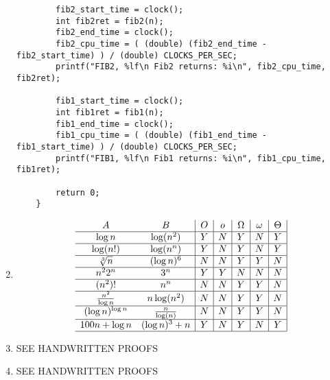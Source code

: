 \documentclass[11pt]{article}
\begin{document}
\begin{enumerate}
\begin{verbatim}
        fib2_start_time = clock();
        int fib2ret = fib2(n);
        fib2_end_time = clock();
        fib2_cpu_time = ( (double) (fib2_end_time - fib2_start_time) ) / (double) CLOCKS_PER_SEC;
        printf("FIB2, %lf\n Fib2 returns: %i\n", fib2_cpu_time, fib2ret);
    
        fib1_start_time = clock();
        int fib1ret = fib1(n);
        fib1_end_time = clock();
        fib1_cpu_time = ( (double) (fib1_end_time - fib1_start_time) ) / (double) CLOCKS_PER_SEC;
        printf("FIB1, %lf\n Fib1 returns: %i\n", fib1_cpu_time, fib1ret);
    
        return 0;
    }
\end{verbatim}

\newpage
\item
$$
\begin{array}{cc|c|c|c|c|c|}
A & B & O & o & \Omega & \omega & \Theta \\ \hline
\log{n} & \log(n^2) & Y & N&Y & N& Y\\ \hline
\log (n!) & \log(n^n) & Y & N&Y & N& Y\\ \hline
\sqrt[3]{n} & (\log n)^{6} &N &N &Y &Y & N\\ \hline
n^22^n & 3^n &Y &Y &N & N& N\\ \hline
(n^2)! & n^n &N &N &Y &Y & N \\ \hline
{n^2 \over \log{n}} & n \log(n^2) &N &N &Y &Y & N \\ \hline
(\log n)^{\log n} & {n \over \log(n)} &N &N &Y &Y & N \\ \hline
100n + \log n & (\log n)^{3} + n & Y & N&Y & N& Y \\ \hline
\end{array}
$$
\newline

\item SEE HANDWRITTEN PROOFS

\item SEE HANDWRITTEN PROOFS

\end{enumerate}
\end{document}
